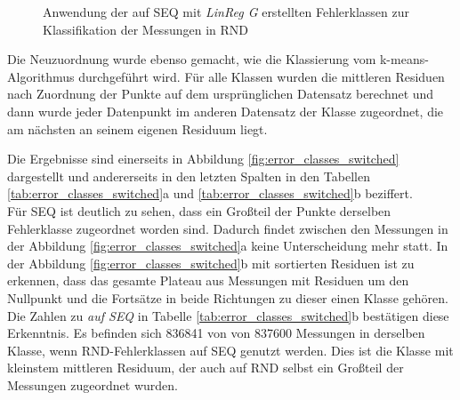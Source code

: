 \documentclass[
	12pt,
	a4paper,
	BCOR10mm,
	DIV14,
	listof=totoc,
	bibliography=totoc,
	headsepline
]{scrreprt}
\begin{document}
\begin{figure}
	\begin{center}
		\caption{Anwendung der auf SEQ mit \textit{LinReg G} erstellten Fehlerklassen zur Klassifikation der Messungen in RND}
		\label{fig:switched_classificators}
	\end{center}
\end{figure} 

Die Neuzuordnung wurde ebenso gemacht, wie die Klassierung vom k-means-Algorithmus durchgeführt wird.
Für alle Klassen wurden die mittleren Residuen nach Zuordnung der Punkte auf dem ursprünglichen Datensatz berechnet und dann wurde jeder Datenpunkt im anderen Datensatz der Klasse zugeordnet, die am nächsten an seinem eigenen Residuum liegt.\medskip

Die Ergebnisse sind einerseits in Abbildung \ref{fig:error_classes_switched} dargestellt und andererseits in den letzten Spalten in den Tabellen \ref{tab:error_classes_switched}a und \ref{tab:error_classes_switched}b beziffert.\\
Für SEQ ist deutlich zu sehen, dass ein Großteil der Punkte derselben Fehlerklasse zugeordnet worden sind. Dadurch findet zwischen den Messungen in der Abbildung \ref{fig:error_classes_switched}a keine Unterscheidung mehr statt.
In der Abbildung \ref{fig:error_classes_switched}b mit sortierten Residuen ist zu erkennen, dass das gesamte Plateau aus Messungen mit Residuen um den Nullpunkt und die Fortsätze in beide Richtungen zu dieser einen Klasse gehören.
Die Zahlen zu \textit{auf SEQ} in Tabelle \ref{tab:error_classes_switched}b bestätigen diese Erkenntnis.
Es befinden sich 836841 von von 837600 Messungen in derselben Klasse, wenn RND-Fehlerklassen auf SEQ genutzt werden.
Dies ist die Klasse mit kleinstem mittleren Residuum, der auch auf RND selbst ein Großteil der Messungen zugeordnet wurden.\medskip
\end{document}
